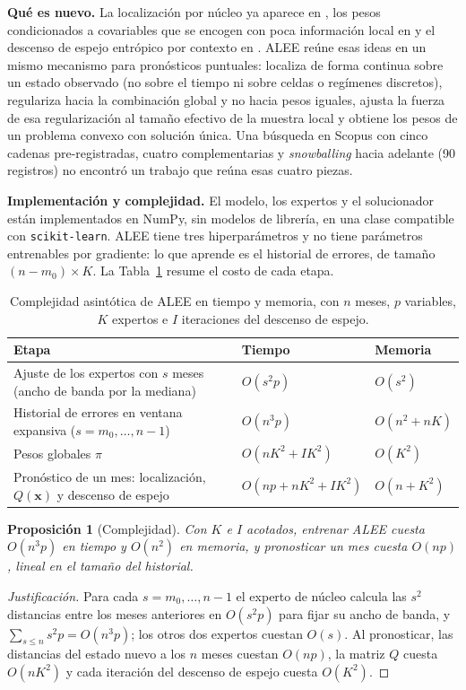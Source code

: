 \documentclass[11pt]{article}
\newtheorem{proposicion}{Proposición}
\begin{document}
\textbf{Qué es nuevo.} La localización por núcleo ya aparece en \cite{li2001}, los pesos condicionados a covariables que se encogen con poca información local en \cite{oelrich2024} y el descenso de espejo entrópico por contexto en \cite{dang2027}. ALEE reúne esas ideas en un mismo mecanismo para pronósticos puntuales: localiza de forma continua sobre un estado observado (no sobre el tiempo ni sobre celdas o regímenes discretos), regulariza hacia la combinación global y no hacia pesos iguales, ajusta la fuerza de esa regularización al tamaño efectivo de la muestra local y obtiene los pesos de un problema convexo con solución única. Una búsqueda en Scopus con cinco cadenas pre-registradas, cuatro complementarias y \textit{snowballing} hacia adelante (90 registros) no encontró un trabajo que reúna esas cuatro piezas.

\textbf{Implementación y complejidad.} El modelo, los expertos y el solucionador están implementados en NumPy, sin modelos de librería, en una clase compatible con \texttt{scikit-learn}. ALEE tiene tres hiperparámetros y no tiene parámetros entrenables por gradiente: lo que aprende es el historial de errores, de tamaño $(n-m_0)\times K$. La Tabla~\ref{tab:complejidad} resume el costo de cada etapa.

\begin{table}[H]
\centering
\caption{Complejidad asintótica de ALEE en tiempo y memoria, con $n$ meses, $p$ variables, $K$ expertos e $I$ iteraciones del descenso de espejo.}
\label{tab:complejidad}
\small
\begin{tabular}{p{7.6cm}ll}
\toprule
Etapa & Tiempo & Memoria \\
\midrule
Ajuste de los expertos con $s$ meses (ancho de banda por la mediana) & $O(s^2p)$ & $O(s^2)$ \\
Historial de errores en ventana expansiva ($s=m_0,\dots,n-1$) & $O(n^3p)$ & $O(n^2+nK)$ \\
Pesos globales $\pi$ & $O(nK^2+IK^2)$ & $O(K^2)$ \\
Pronóstico de un mes: localización, $Q(\mathbf{x})$ y descenso de espejo & $O(np+nK^2+IK^2)$ & $O(n+K^2)$ \\
\bottomrule
\end{tabular}
\end{table}

\begin{proposicion}[Complejidad]
Con $K$ e $I$ acotados, entrenar ALEE cuesta $O(n^3p)$ en tiempo y $O(n^2)$ en memoria, y pronosticar un mes cuesta $O(np)$, lineal en el tamaño del historial.
\end{proposicion}
\begin{proof}[Justificación]
Para cada $s=m_0,\dots,n-1$ el experto de núcleo calcula las $s^2$ distancias entre los meses anteriores en $O(s^2p)$ para fijar su ancho de banda, y $\sum_{s\le n}s^2p=O(n^3p)$; los otros dos expertos cuestan $O(s)$. Al pronosticar, las distancias del estado nuevo a los $n$ meses cuestan $O(np)$, la matriz $Q$ cuesta $O(nK^2)$ y cada iteración del descenso de espejo cuesta $O(K^2)$.
\end{proof}
\end{document}
